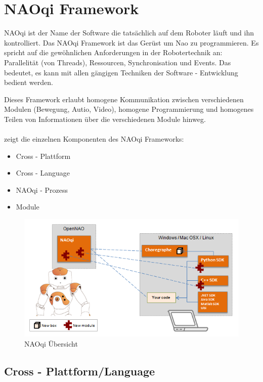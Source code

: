 \section{NAOqi Framework}

NAOqi ist der Name der Software die tatsächlich auf dem Roboter läuft und ihn kontrolliert. Das NAOqi Framework ist das Gerüst um Nao zu programmieren. Es spricht auf die gewöhnlichen Anforderungen in der Robotertechnik an: Parallelität (von Threads), Ressourcen, Synchronisation und Events. Das bedeutet, es kann mit allen gängigen Techniken der Software - Entwicklung bedient werden. 

Dieses Framework erlaubt homogene Kommunikation zwischen verschiedenen Modulen (Bewegung, Autio, Video), homogene Programmierung und homogenes Teilen von Informationen über die verschiedenen Module hinweg.
\\
\\
\noindent
{} zeigt die einzelnen Komponenten des NAOqi Frameworks:
\begin{itemize}
\item Cross - Plattform
\item Cross - Language
\item NAOqi - Prozess
\item Module
\end{itemize}

\begin{figure}[H]						
	\centering							
	\includegraphics[scale=0.8]{Bilder/naoqi_ov.PNG}
	\caption{NAOqi Übersicht}						
	\label{f:naoqi_ov}						
\end{figure}


\subsection{Cross - Plattform/Language}

